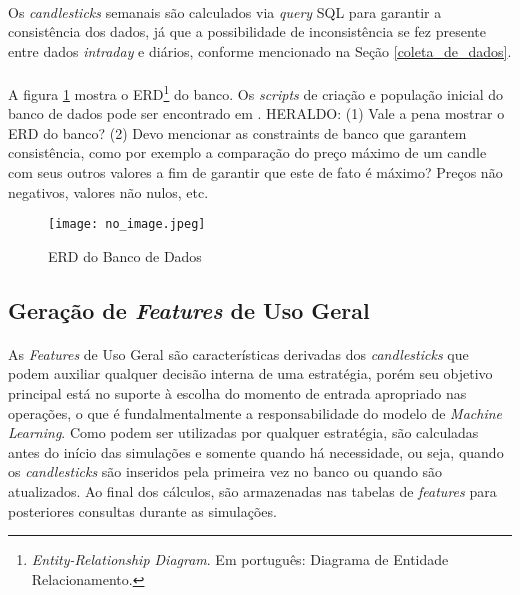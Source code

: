 \paragraph{} Os \textit{candlesticks} semanais são calculados via \textit{query} SQL para garantir a consistência dos dados, já que a possibilidade de inconsistência se fez presente entre dados \textit{intraday} e diários, conforme mencionado na Seção \ref{coleta_de_dados}.

\paragraph{} A figura \ref{fig:103} mostra o ERD\footnote{\textit{Entity-Relationship Diagram}. Em português: Diagrama de Entidade Relacionamento.} do banco. Os \textit{scripts} de criação e população inicial do banco de dados pode ser encontrado em \cite{github_projeto}. \color{red} HERALDO: (1) Vale a pena mostrar o ERD do banco? (2) Devo mencionar as constraints de banco que garantem consistência, como por exemplo a comparação do preço máximo de um candle com seus outros valores a fim de garantir que este de fato é máximo? Preços não negativos, valores não nulos, etc. 

\begin{figure}[h]
    \texttt{[image: no\_image.jpeg]}
    \centering
    \caption{ERD do Banco de Dados}
    \label{fig:103}
\end{figure}



\subsection{Geração de \textit{Features} de Uso Geral}
\label{sub:features}

\paragraph{} As \textit{Features} de Uso Geral são características derivadas dos \textit{candlesticks} que podem auxiliar qualquer decisão interna de uma estratégia, porém seu objetivo principal está no suporte à escolha do momento de entrada apropriado nas operações, o que é fundalmentalmente a responsabilidade do modelo de \textit{Machine Learning}. Como podem ser utilizadas por qualquer estratégia, são calculadas antes do início das simulações e somente quando há necessidade, ou seja, quando os \textit{candlesticks} são inseridos pela primeira vez no banco ou quando são atualizados. Ao final dos cálculos, são armazenadas nas tabelas de \textit{features} para posteriores consultas durante as simulações.


